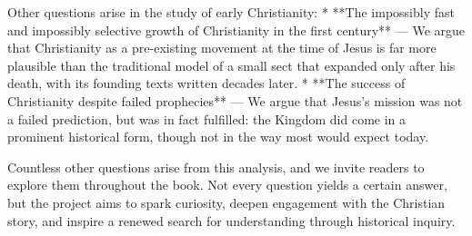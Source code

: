 Other questions arise in the study of early Christianity:
* **The impossibly fast and impossibly selective growth of Christianity in the first century** — We argue that Christianity as a pre-existing movement at the time of Jesus is far more plausible than the traditional model of a small sect that expanded only after his death, with its founding texts written decades later.
* **The success of Christianity despite failed prophecies** — We argue that Jesus’s mission was not a failed prediction, but was in fact fulfilled: the Kingdom did come in a prominent historical form, though not in the way most would expect today.

Countless other questions arise from this analysis, and we invite readers to explore them throughout the book.
Not every question yields a certain answer, but the project aims to spark curiosity, deepen engagement with the Christian story, and inspire a renewed search for understanding through historical inquiry.
